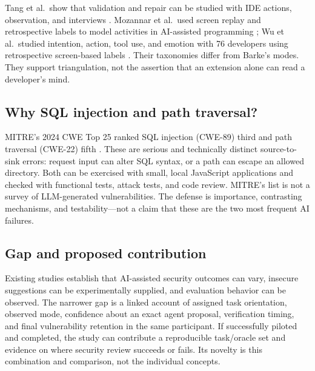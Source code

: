 \documentclass[12pt,a4paper]{article}
\begin{document}
Tang et al.\ show that validation and repair can be studied with IDE actions, observation, and interviews \cite{tang2024}. Mozannar et al.\ used screen replay and retrospective labels to model activities in AI-assisted programming \cite{mozannar2024}; Wu et al.\ studied intention, action, tool use, and emotion with 76 developers using retrospective screen-based labels \cite{wu2026}. Their taxonomies differ from Barke's modes. They support triangulation, not the assertion that an extension alone can read a developer's mind.

\subsection{Why SQL injection and path traversal?}
MITRE's 2024 CWE Top 25 ranked SQL injection (CWE-89) third and path traversal (CWE-22) fifth \cite{mitre2024}. These are serious and technically distinct source-to-sink errors: request input can alter SQL syntax, or a path can escape an allowed directory. Both can be exercised with small, local JavaScript applications and checked with functional tests, attack tests, and code review. MITRE's list is not a survey of LLM-generated vulnerabilities. The defense is importance, contrasting mechanisms, and testability---not a claim that these are the two most frequent AI failures.

\subsection{Gap and proposed contribution}
Existing studies establish that AI-assisted security outcomes can vary, insecure suggestions can be experimentally supplied, and evaluation behavior can be observed. The narrower gap is a linked account of assigned task orientation, observed mode, confidence about an exact agent proposal, verification timing, and final vulnerability retention in the same participant. If successfully piloted and completed, the study can contribute a reproducible task/oracle set and evidence on where security review succeeds or fails. Its novelty is this combination and comparison, not the individual concepts.
\end{document}
